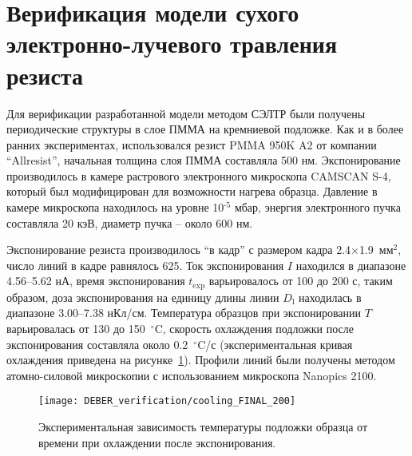\section{Верификация модели сухого электронно-лучевого травления резиста} \label{sec:verification}

Для верификации разработанной модели методом СЭЛТР были получены периодические структуры в слое ПММА на кремниевой подложке. Как и в более ранних экспериментах, использовался резист PMMA 950K A2 от компании ``Allresist'', начальная толщина слоя ПММА составляла 500 нм. Экспонирование производилось в камере растрового электронного микроскопа CAMSCAN S-4, который был модифицирован для возможности нагрева образца. Давление в камере микроскопа находилось на уровне 10$^{\text{-5}}$ мбар, энергия электронного пучка составляла 20 кэВ, диаметр пучка -- около 600 нм.

Экспонирование резиста производилось ``в кадр'' с размером кадра 2.4$\times$1.9~мм$^\text{2}$, число линий в кадре равнялось 625. Ток экспонирования $I$ находился в диапазоне 4.56--5.62 нА, время экспонирования $t_\mathrm{exp}$ варьировалось от 100 до 200 с, таким образом, доза экспонирования на единицу длины линии $D_\mathrm{l}$ находилась в диапазоне 3.00--7.38 нКл/см. Температура образцов при экспонировании $T$ варьировалась от 130 до 150~$^\circ$C, скорость охлаждения подложки после экспонирования составляла около 0.2~$^\circ$C/с (экспериментальная кривая охлаждения приведена на рисунке~\ref{fig:exp_cooling}). Профили линий были получены методом атомно-силовой микроскопии с использованием микроскопа Nanopics 2100.

\begin{figure}[h!]
	\begin{center}
		\texttt{[image: DEBER\_verification/cooling\_FINAL\_200]} \\
	\end{center}
	\vspace{-1em}
	\caption{Экспериментальная зависимость температуры подложки образца от времени при охлаждении после экспонирования.}
	\label{fig:exp_cooling}
	\vspace{1em}
\end{figure}

